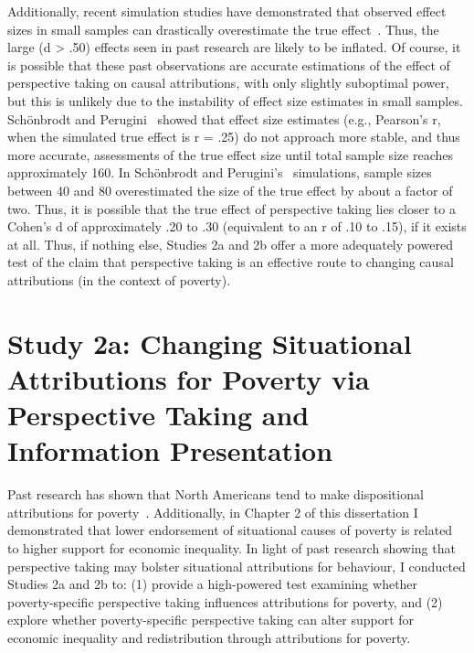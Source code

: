 \documentclass{sfuthesis}
\begin{document}
Additionally, recent simulation studies have demonstrated that observed effect sizes in small samples can drastically overestimate the true effect~\cite{schonbrodt13}. Thus, the large (d > .50) effects seen in past research are likely to be inflated. Of course, it is possible that these past observations are accurate estimations of the effect of perspective taking on causal attributions, with only slightly suboptimal power, but this is unlikely due to the instability of effect size estimates in small samples. Schönbrodt and Perugini~\cite{schonbrodt13} showed that effect size estimates (e.g., Pearson’s r, when the simulated true effect is r = .25) do not approach more stable, and thus more accurate, assessments of the true effect size until total sample size reaches approximately 160. In Schönbrodt and Perugini’s~\cite{schonbrodt13} simulations, sample sizes between 40 and 80 overestimated the size of the true effect by about a factor of two. Thus, it is possible that the true effect of perspective taking lies closer to a Cohen’s d of approximately .20 to .30 (equivalent to an r of .10 to .15), if it exists at all. Thus, if nothing else, Studies 2a and 2b offer a more adequately powered test of the claim that perspective taking is an effective route to changing causal attributions (in the context of poverty).

\section{Study 2a: Changing Situational Attributions for Poverty via Perspective Taking and Information Presentation}

Past research has shown that North Americans tend to make dispositional attributions for poverty~\cite{cozzarelli01, feather74}. Additionally, in Chapter 2 of this dissertation I demonstrated that lower endorsement of situational causes of poverty is related to higher support for economic inequality. In light of past research showing that perspective taking may bolster situational attributions for behaviour, I conducted Studies 2a and 2b to: (1) provide a high-powered test examining whether poverty-specific perspective taking influences attributions for poverty, and (2) explore whether poverty-specific perspective taking can alter support for economic inequality and redistribution through attributions for poverty. 
\end{document}
